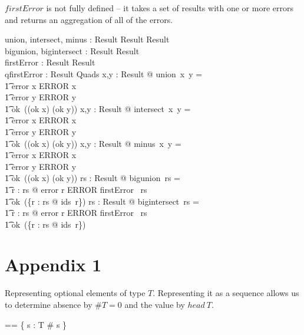 \documentclass{article}
\begin{document}
$firstError$ is not fully defined -- it takes a set of results with one or more errors
and returns an aggregation of all of the errors.
\begin{gendef}
   union, intersect, minus : Result \fun Result \fun Result \\
   bigunion, bigintersect : \power Result \fun Result \\
   firstError : \power Result \pfun Result \\
   qfirstError : \power Result \pfun Quads 
\where
   \forall x,y : Result @ union~x~y = \\
\t1 \IF error \inv x \in ERROR \THEN x \\
\t1 \ELSE \IF error \inv y \in ERROR \THEN y \\
\t1 \ELSE ok~((ok \inv x) \cup (ok \inv y))
\also
   \forall x,y : Result @ intersect~x~y = \\
\t1 \IF error \inv x \in ERROR \THEN x \\
\t1 \ELSE \IF error \inv y \in ERROR \THEN y \\
\t1 \ELSE ok~((ok \inv x) \cap (ok \inv y))
\also
   \forall x,y : Result @ minus~x~y = \\
\t1 \IF error \inv x \in ERROR \THEN x \\
\t1 \ELSE \IF error \inv y \in ERROR \THEN y \\
\t1 \ELSE ok~((ok \inv x) \setminus (ok \inv y))
\also
  \forall rs : \power Result @ bigunion~rs = \\
\t1 \IF \exists r : rs @ error \inv r \in ERROR \THEN firstError~ rs \\
\t1 \ELSE ok~(\bigcup \{r : rs @ ids~r\})
\also
  \forall rs : \power Result @ bigintersect~rs = \\
\t1 \IF \exists r : rs @ error \inv r \in ERROR \THEN firstError~ rs \\
\t1 \ELSE ok~(\bigcap \{r : rs @ ids~r\})
\end{gendef}

   

\section{Appendix 1}
Representing optional elements of type $T$.  Representing it as a sequence allows us to
determine absence by $\#T = 0$ and the value by $head~T$. 

\begin{zed} 
  \optional[T] == \{ s : \seq T \mid \# s  \} \\
\end{zed}
\end{document}
